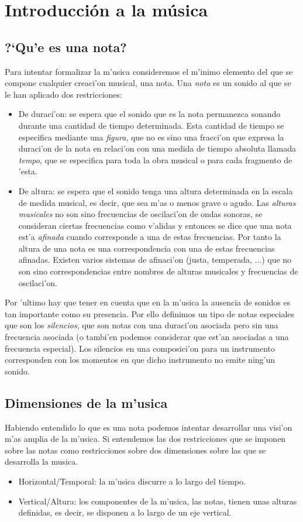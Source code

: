 ﻿\chapter{Introducci\'on a la m\'usica}
\section{?`Qu'e es una nota?}
Para intentar formalizar la m'usica consideremos el m'inimo elemento del que se compone cualquier creaci'on musical, una  nota. Una \emph{nota} es un sonido al que se le han aplicado dos restricciones:
\begin{itemize}
\item De duraci'on: se espera que el sonido que es la nota permanezca sonando durante una cantidad de tiempo determinada. Esta cantidad de tiempo se especifica mediante una \emph{figura}, que no es sino una fracci'on que expresa la duraci'on de la nota en relaci'on con una medida de tiempo absoluta llamada \emph{tempo}, que se especifica para toda la obra musical o para cada fragmento de 'esta.
\item De altura: se espera que el sonido tenga una altura determinada en la escala de medida musical, es decir, que sea m'as o menos grave o agudo. Las \emph{alturas musicales} no son sino frecuencias de oscilaci'on de ondas sonoras, se consideran ciertas frecuencias como v'alidas y entonces se dice que una nota est'a \emph{afinada} cuando corresponde a una de estas frecuencias. Por tanto la altura de una nota es una correspondencia con una de estas frecuencias afinadas. Existen varios sistemas de afinaci'on (justa, temperada, ...) que no son sino correspondencias entre nombres de alturas musicales y frecuencias de oscilaci'on.
\end{itemize}

Por 'ultimo hay que tener en cuenta que en la m'usica la ausencia de sonidos es tan importante como su presencia. Por ello definimos un tipo de notas especiales que son los \emph{silencios}, que son notas con una duraci'on asociada pero sin una frecuencia asociada (o tambi'en podemos considerar que est'an asociadas a una frecuencia especial). Los silencios en una composici'on para un instrumento corresponden con los momentos en que dicho instrumento no emite ning'un sonido.


\section{Dimensiones de la m'usica}
Habiendo entendido lo que es una nota podemos intentar desarrollar una visi'on m'as amplia de la m'usica. Si entendemos las dos restricciones que se imponen sobre las notas como restricciones sobre dos dimensiones sobre las que se desarrolla la musica.
\begin{itemize}
\item Horizontal/Temporal: la m'usica discurre a lo largo del tiempo.
\item Vertical/Altura: los componentes de la m'usica, las notas, tienen unas alturas definidas, es decir, se disponen a lo largo de un eje vertical.
\end{itemize}

